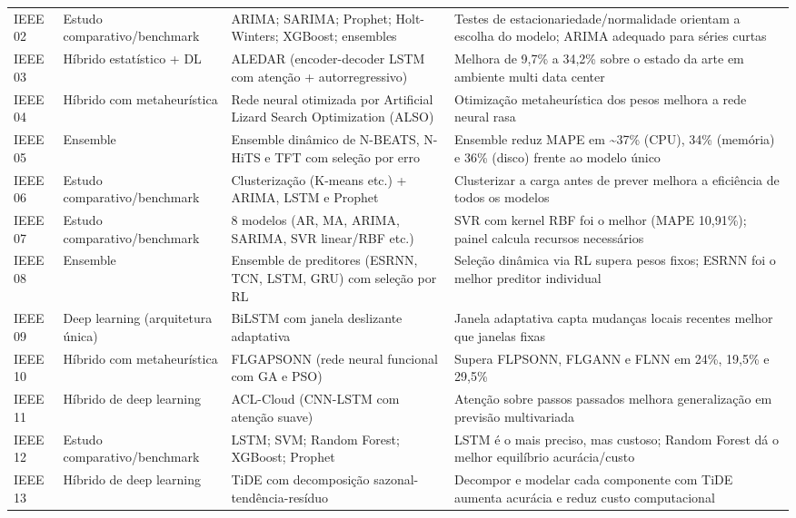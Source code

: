 {\begin{longtable}{p{1.3cm}p{2.6cm}p{5.0cm}p{5.9cm}}
IEEE 02 & Estudo comparativo/benchmark & ARIMA; SARIMA; Prophet; Holt-Winters; XGBoost; ensembles & Testes de estacionariedade/normalidade orientam a escolha do modelo; ARIMA adequado para séries curtas \\
IEEE 03 & Híbrido estatístico + DL & ALEDAR (encoder-decoder LSTM com atenção + autorregressivo) & Melhora de 9,7\% a 34,2\% sobre o estado da arte em ambiente multi data center \\
IEEE 04 & Híbrido com metaheurística & Rede neural otimizada por Artificial Lizard Search Optimization (ALSO) & Otimização metaheurística dos pesos melhora a rede neural rasa \\
IEEE 05 & Ensemble & Ensemble dinâmico de N-BEATS, N-HiTS e TFT com seleção por erro & Ensemble reduz MAPE em \textasciitilde{}37\% (CPU), 34\% (memória) e 36\% (disco) frente ao modelo único \\
IEEE 06 & Estudo comparativo/benchmark & Clusterização (K-means etc.) + ARIMA, LSTM e Prophet & Clusterizar a carga antes de prever melhora a eficiência de todos os modelos \\
IEEE 07 & Estudo comparativo/benchmark & 8 modelos (AR, MA, ARIMA, SARIMA, SVR linear/RBF etc.) & SVR com kernel RBF foi o melhor (MAPE 10,91\%); painel calcula recursos necessários \\
IEEE 08 & Ensemble & Ensemble de preditores (ESRNN, TCN, LSTM, GRU) com seleção por RL & Seleção dinâmica via RL supera pesos fixos; ESRNN foi o melhor preditor individual \\
IEEE 09 & Deep learning (arquitetura única) & BiLSTM com janela deslizante adaptativa & Janela adaptativa capta mudanças locais recentes melhor que janelas fixas \\
IEEE 10 & Híbrido com metaheurística & FLGAPSONN (rede neural funcional com GA e PSO) & Supera FLPSONN, FLGANN e FLNN em 24\%, 19,5\% e 29,5\% \\
IEEE 11 & Híbrido de deep learning & ACL-Cloud (CNN-LSTM com atenção suave) & Atenção sobre passos passados melhora generalização em previsão multivariada \\
IEEE 12 & Estudo comparativo/benchmark & LSTM; SVM; Random Forest; XGBoost; Prophet & LSTM é o mais preciso, mas custoso; Random Forest dá o melhor equilíbrio acurácia/custo \\
IEEE 13 & Híbrido de deep learning & TiDE com decomposição sazonal-tendência-resíduo & Decompor e modelar cada componente com TiDE aumenta acurácia e reduz custo computacional \\

\end{longtable}}
